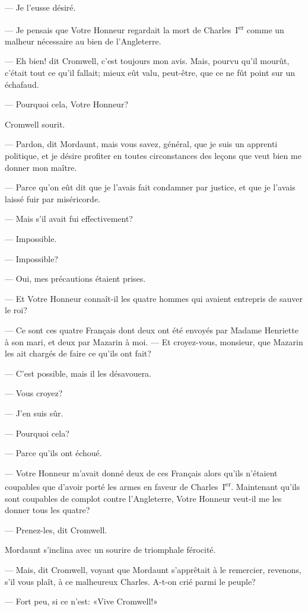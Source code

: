 — Je l'eusse désiré.

— Je pensais que Votre Honneur regardait la mort de Charles~I\textsuperscript{er} comme un malheur nécessaire au bien de l'Angleterre.

— Eh bien! dit Cromwell, c'est toujours mon avis. Mais, pourvu qu'il mourût, c'était tout ce qu'il fallait; mieux eût valu, peut-être, que ce ne fût point sur un échafaud.

— Pourquoi cela, Votre Honneur?

Cromwell sourit.

— Pardon, dit Mordaunt, mais vous savez, général, que je suis un apprenti politique, et je désire profiter en toutes circonstances des leçons que veut bien me donner mon maître.

— Parce qu'on eût dit que je l'avais fait condamner par justice, et que je l'avais laissé fuir par miséricorde.

— Mais s'il avait fui effectivement?

— Impossible.

— Impossible?

— Oui, mes précautions étaient prises.

— Et Votre Honneur connaît-il les quatre hommes qui avaient entrepris de sauver le roi?

— Ce sont ces quatre Français dont deux ont été envoyés par Madame Henriette à son mari, et deux par Mazarin à moi.
— Et croyez-vous, monsieur, que Mazarin les ait chargés de faire ce qu'ils ont fait?

— C'est possible, mais il les désavouera.

— Vous croyez?

— J'en suis sûr.

— Pourquoi cela?

— Parce qu'ils ont échoué.

— Votre Honneur m'avait donné deux de ces Français alors qu'ils n'étaient coupables que d'avoir porté les armes en faveur de Charles~I\textsuperscript{er}. Maintenant qu'ils sont coupables de complot contre l'Angleterre, Votre Honneur veut-il me les donner tous les quatre?

— Prenez-les, dit Cromwell.

Mordaunt s'inclina avec un sourire de triomphale férocité.

— Mais, dit Cromwell, voyant que Mordaunt s'apprêtait à le remercier, revenons, s'il vous plaît, à ce malheureux Charles. A-t-on crié parmi le peuple?

— Fort peu, si ce n'est: «Vive Cromwell!»

